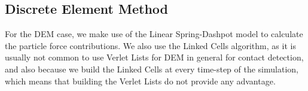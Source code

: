 \documentclass[Afour,sageh,times]{sagej}
\begin{document}
\subsection{Discrete Element Method}

For the \ac{DEM} case, we make use of the Linear Spring-Dashpot model to calculate the particle force contributions.
We also use the Linked Cells algorithm, as it is usually not common to use Verlet Lists for \ac{DEM} in general for contact detection, and also because we build the Linked Cells at every time-step of the simulation, which means that building the Verlet Lists do not provide any advantage.

%

\end{document}

